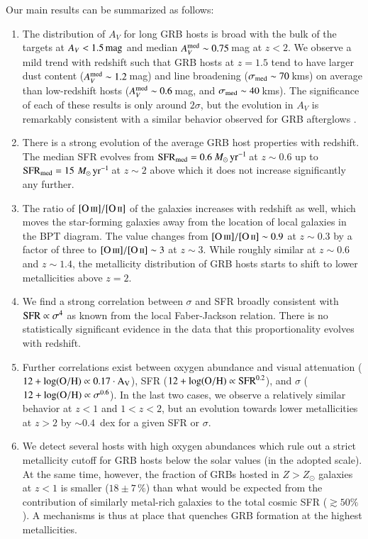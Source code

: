 \documentclass[traditabstract, longauth]{aa}
\newcommand{\oh}{12+\log(\rm{O/H})}
\newcommand{\oii}{[\ion{O}{ii}]}
\newcommand{\oiii}{[\ion{O}{iii}]}
\newcommand{\Msunyr}{$M_\odot\,\rm{yr}^{-1}$}
\begin{document}
Our main results can be summarized as follows:
\begin{enumerate}
\item The distribution of $A_V$ for long GRB hosts is broad with the bulk of the targets at $A_V<1.5\,\rm{mag}$ and median $A_V^{\rm med} \sim 0.75$\,mag at $z<2$. We observe a mild trend with redshift such that GRB hosts at $z = 1.5$ tend to have larger dust content ($A_V^{\rm med} \sim 1.2$\,mag) and line broadening ($\sigma_{\rm{med}}\sim70$\,kms) on average than low-redshift hosts ($A_V^{\rm med} \sim 0.6$\,mag, and $\sigma_{\rm{med}}\sim40$\,kms). The significance of each of these results is only around $2\sigma$, but the evolution in $A_V$ is remarkably consistent with a similar behavior observed for GRB afterglows \citep{2013MNRAS.432.1231C}.
\item There is a strong evolution of the average GRB host properties with redshift. The median SFR evolves from $\rm{SFR_{med}} = 0.6$\,\Msunyr\,at $z\sim0.6$ up to $\rm{SFR_{med}} = 15$\,\Msunyr\,at $z\sim2$ above which it does not increase significantly any further. 
\item The ratio of $\oiii/\oii$ of the galaxies increases with redshift as well, which moves the star-forming galaxies away from the location of local galaxies in the BPT diagram. The value changes from  $\oiii/\oii\sim0.9$ at $z\sim0.3$ by a factor of three to $\oiii/\oii\sim3$ at $z\sim3$. While roughly similar at $z\sim0.6$ and $z\sim1.4$, the metallicity distribution of GRB hosts starts to shift to lower metallicities above $z=2$.
\item We find a strong correlation between $\sigma$ and SFR broadly consistent with $\rm{SFR}\propto\sigma^4$ as known from the local Faber-Jackson relation. There is no statistically significant evidence in the data that this proportionality evolves with redshift. 
\item Further correlations exist between oxygen abundance and visual attenuation ($\oh \propto 0.17\cdot A_V$), SFR  ($\oh \propto\mathrm{SFR}^{0.2}$), and $\sigma$ ($\oh \propto\sigma^{0.6}$). In the last two cases, we observe a relatively similar behavior at $z < 1$ and $1<z<2$, but an evolution towards lower metallicities at $z > 2$ by $\sim 0.4$~dex for a given SFR or $\sigma$.

\item We detect several hosts with high oxygen abundances which rule out a strict metallicity cutoff for GRB hosts below the solar values (in the adopted scale). At the same time, however, the fraction of GRBs hosted in $Z>Z_{\odot}$ galaxies at $z<1$ is smaller ($18\pm7\,\%$) than what would be expected from the contribution of similarly metal-rich galaxies to the total cosmic SFR ($\gtrsim 50\%$). A mechanisms is thus at place that quenches GRB formation at the highest metallicities. 
\end{enumerate}
\end{document}
